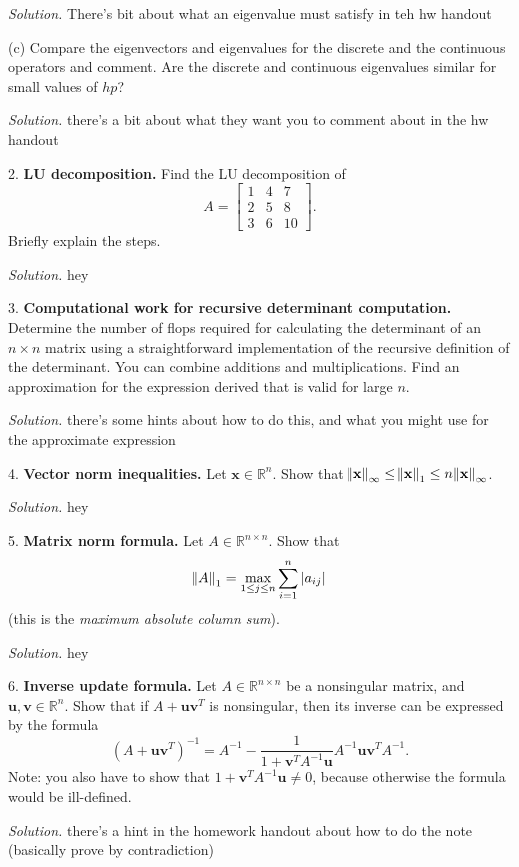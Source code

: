 \documentclass{article}
\def\*#1{\mathbf{#1}}
\newcommand{\R}{\mathbb{R}}
\begin{document}
\textit{Solution.}
There's bit about what an eigenvalue must satisfy in teh hw handout

\vspace{5mm}

(c) Compare the eigenvectors and eigenvalues for the discrete and the
continuous operators and comment. Are the discrete and continuous eigenvalues
similar for small values of $hp$?

\textit{Solution.}
there's a bit about what they want you to comment about in the hw handout

\newpage

2. \textbf{LU decomposition.}
Find the LU decomposition of
%
\begin{equation*}
    A = 
    \begin{bmatrix}
        1 & 4 & 7 \\
        2 & 5 & 8 \\
        3 & 6 & 10
    \end{bmatrix}
    .
\end{equation*}
%
Briefly explain the steps.

\textit{Solution.}
hey

\newpage

3. \textbf{Computational work for recursive determinant computation.}
Determine the number of flops required for calculating the determinant
of an $n \times n$ matrix using a straightforward implementation of the recursive
definition of the determinant. You can combine additions and multiplications.
Find an approximation for the expression derived that is valid for large $n$.

\textit{Solution.}
there's some hints about how to do this, and what you might use for the approximate expression

\newpage

4. \textbf{Vector norm inequalities.}
Let $\*x \in \R^n$. Show that
$\enVert{\*x}_\infty \leq \enVert{\*x}_1 \leq n \enVert{\*x}_\infty$.

\textit{Solution.}
hey

\newpage

5. \textbf{Matrix norm formula.}
Let $A \in \R^{n \times n}$. Show that
%
\begin{equation*}
    \enVert{A}_1 = \max_{1 \leq j \leq n} \sum_{i = 1}^n |a_{ij}|
\end{equation*}
%
(this is the \textit{maximum absolute column sum}).

\textit{Solution.}
hey

\newpage

6. \textbf{Inverse update formula.}
Let $A \in \R^{n \times n}$ be a nonsingular matrix, and $\*u, \*v \in \R^n$.
Show that if $A + \*u \*v^T$ is nonsingular, then its inverse can be expressed
by the formula
%
\begin{equation*}
    (A + \*u \*v^T)^{-1} = A^{-1} - \frac{1}{1 + \*v^T A^{-1} \*u} A^{-1} \*u \*v^T A^{-1}.
\end{equation*}
%
Note: you also have to show that $1 + \*v^T A^{-1} \*u \neq 0$, because otherwise the formula
would be ill-defined.

\textit{Solution.}
there's a hint in the homework handout about how to do the note (basically prove by contradiction)
\end{document}
